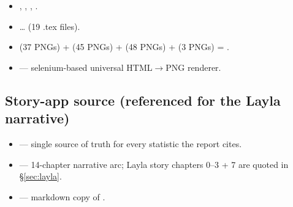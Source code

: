 \begin{itemize}\setlength{\itemsep}{0pt}
  \item {}, , ,
        .
  \item {} \ldots
         (19 .tex files).
  \item {} (37 PNGs) +
         (45 PNGs) +
         (48 PNGs) +
         (3 PNGs) = .
  \item {} — selenium-based universal
        HTML$\to$PNG renderer.
\end{itemize}

\subsection{Story-app source (referenced for the Layla narrative)}

\begin{itemize}\setlength{\itemsep}{0pt}
  \item {} — single source of truth for every
        statistic the report cites.
  \item {} — 14-chapter narrative arc;
        Layla story chapters 0--3 + 7 are quoted in
        \S\ref{sec:layla}.
  \item {} — markdown copy of .
\end{itemize}
